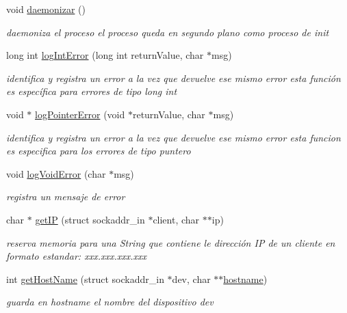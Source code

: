 \begin{DoxyCompactItemize}
\item 
void \hyperlink{_g-2301-05-_p1-tools_8c_a79f6ea5350079c571138b0a00af1f5a4}{daemonizar} ()
\begin{DoxyCompactList}\small\item\em daemoniza el proceso el proceso queda en segundo plano como proceso de init \end{DoxyCompactList}\item 
long int \hyperlink{_g-2301-05-_p1-tools_8c_a6349dfcf345b8d45a1be65e3e17739fe}{log\-Int\-Error} (long int return\-Value, char $\ast$msg)
\begin{DoxyCompactList}\small\item\em identifica y registra un error a la vez que devuelve ese mismo error esta función es específica para errores de tipo long int \end{DoxyCompactList}\item 
void $\ast$ \hyperlink{_g-2301-05-_p1-tools_8c_a192fd5bf4f47fe63d449f291f92732a9}{log\-Pointer\-Error} (void $\ast$return\-Value, char $\ast$msg)
\begin{DoxyCompactList}\small\item\em identifica y registra un error a la vez que devuelve ese mismo error esta funcion es especifica para los errores de tipo puntero \end{DoxyCompactList}\item 
void \hyperlink{_g-2301-05-_p1-tools_8c_a5b92fdc34c0427eb5cf8360e68aa9287}{log\-Void\-Error} (char $\ast$msg)
\begin{DoxyCompactList}\small\item\em registra un mensaje de error \end{DoxyCompactList}\item 
char $\ast$ \hyperlink{_g-2301-05-_p1-tools_8c_a2850885f03b7654d239b361940416bef}{get\-I\-P} (struct sockaddr\-\_\-in $\ast$client, char $\ast$$\ast$ip)
\begin{DoxyCompactList}\small\item\em reserva memoria para una String que contiene le dirección I\-P de un cliente en formato estandar\-: xxx.\-xxx.\-xxx.\-xxx \end{DoxyCompactList}\item 
int \hyperlink{_g-2301-05-_p1-tools_8c_a3101bc13b5c20c8b430348441050ae9d}{get\-Host\-Name} (struct sockaddr\-\_\-in $\ast$dev, char $\ast$$\ast$\hyperlink{servidor___i_r_c_8c_af203df082d5c6dcaa0c88b07cf86466d}{hostname})
\begin{DoxyCompactList}\small\item\em guarda en hostname el nombre del dispositivo dev \end{DoxyCompactList}\item 

\end{DoxyCompactItemize}
